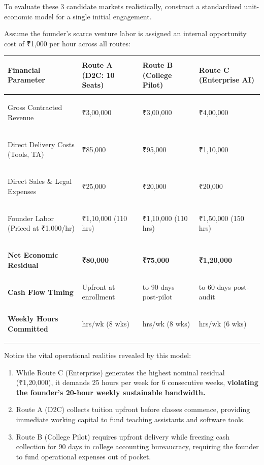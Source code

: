 To evaluate these 3 candidate markets realistically, construct a standardized unit-economic model for a single initial engagement.

Assume the founder's scarce venture labor is assigned an internal opportunity cost of ₹1,000 per hour across all routes:

\begin{tcolorbox}[
  enhanced,
  colback=BayesSurface!60,
  colframe=BayesBorder,
  boxrule=0.5pt,
  arc=3pt,
  left=3pt,right=3pt,top=3pt,bottom=3pt,
  boxsep=1pt
]
\scriptsize
\begin{tabularx}{\linewidth}{>{\bfseries\raggedright\arraybackslash}p{2.4cm} >{\raggedleft\arraybackslash}p{1.5cm} >{\raggedleft\arraybackslash}p{1.5cm} >{\raggedleft\arraybackslash}p{1.5cm}}
\toprule
\textbf{Financial Parameter} & \textbf{Route A (D2C: 10 Seats)} & \textbf{Route B (College Pilot)} & \textbf{Route C (Enterprise AI)} \\
\midrule
Gross Contracted Revenue & ₹3,00,000 & ₹3,00,000 & ₹4,00,000 \\
Direct Delivery Costs (Tools, TA) & ₹85,000 & ₹95,000 & ₹1,10,000 \\
Direct Sales \& Legal Expenses & ₹25,000 & ₹20,000 & ₹20,000 \\
Founder Labor (Priced at ₹1,000/hr) & ₹1,10,000 (110 hrs) & ₹1,10,000 (110 hrs) & ₹1,50,000 (150 hrs) \\
\midrule
\textbf{Net Economic Residual} & \textbf{₹80,000} & \textbf{₹75,000} & \textbf{₹1,20,000} \\
\midrule
\textbf{Cash Flow Timing} & Upfront at enrollment & 60 to 90 days post-pilot & 30 to 60 days post-audit \\
\textbf{Weekly Hours Committed} & 14 hrs/wk (8 wks) & 14 hrs/wk (8 wks) & 25 hrs/wk (6 wks) \\
\bottomrule
\end{tabularx}
\end{tcolorbox}

Notice the vital operational realities revealed by this model:
\begin{enumerate}[leftmargin=12pt,itemsep=1pt,topsep=1pt,parsep=0pt]
  \item While Route C (Enterprise) generates the highest nominal residual (₹1,20,000), it demands 25 hours per week for 6 consecutive weeks, \textbf{violating the founder's 20-hour weekly sustainable bandwidth.}
  \item Route A (D2C) collects tuition upfront before classes commence, providing immediate working capital to fund teaching assistants and software tools.
  \item Route B (College Pilot) requires upfront delivery while freezing cash collection for 90 days in college accounting bureaucracy, requiring the founder to fund operational expenses out of pocket.
\end{enumerate}

